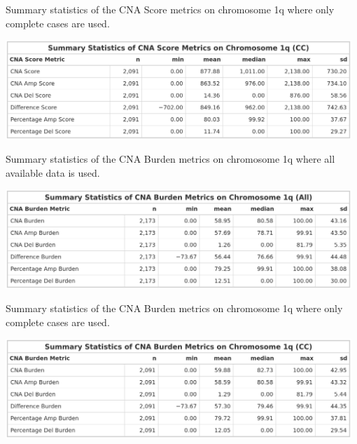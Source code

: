 \begin{table}[!ht]
\center
\caption[Summary statistics of the CNA Score metrics on chromosome 1q where only complete cases are used.]{Summary statistics of the CNA Score metrics on chromosome 1q where only complete cases are used.}
\includegraphics[width = 0.98\textwidth]{../tables/Chapter_2/CNA_Score_Metric_CCA_Chr1q_Summary.png}
\label{tab:Score_CCA_Chr1q}
\end{table}

\begin{table}[!ht]
\center
\caption[Summary statistics of the CNA Burden metrics on chromosome 1q where all available data is used.]{Summary statistics of the CNA Burden metrics on chromosome 1q where all available data is used.}
\includegraphics[width = 0.98\textwidth]{../tables/Chapter_2/CNA_Burden_Metric_All_Chr1q_Summary.png}
\label{tab:Burden_All_Chr1q}
\end{table}

\begin{table}[!ht]
\center
\caption[Summary statistics of the CNA Burden metrics on chromosome 1q where only complete cases are used.]{Summary statistics of the CNA Burden metrics on chromosome 1q where only complete cases are used.}
\includegraphics[width = 0.98\textwidth]{../tables/Chapter_2/CNA_Burden_Metric_CCA_Chr1q_Summary.png}
\label{tab:Burden_CCA_Chr1q}
\end{table}


